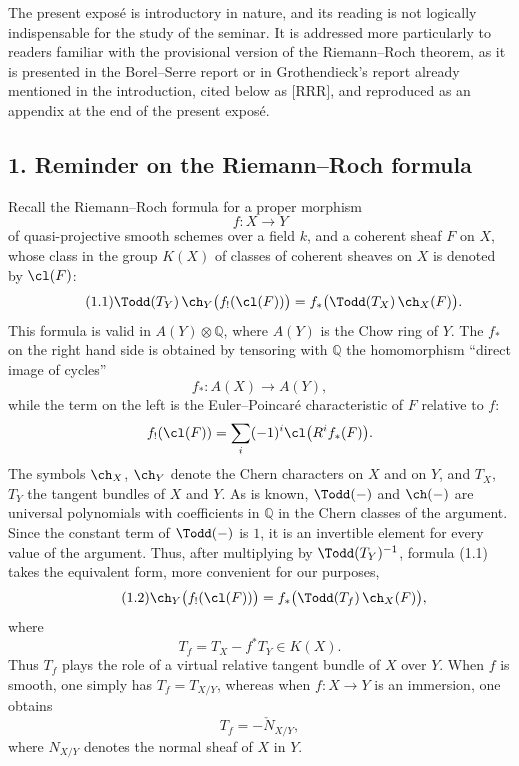 The present exposé is introductory in nature, and its reading is not logically indispensable for the study of the seminar. It is addressed more particularly to readers familiar with the provisional version of the Riemann--Roch theorem, as it is presented in the Borel--Serre report or in Grothendieck's report already mentioned in the introduction, cited below as [RRR], and reproduced as an appendix at the end of the present exposé.

\subsection*{1. Reminder on the Riemann--Roch formula}
Recall the Riemann--Roch formula for a proper morphism
\[
f:X\longrightarrow Y
\]
of quasi-projective smooth schemes over a field $k$, and a coherent sheaf $F$ on $X$, whose class in the group $K(X)$ of classes of coherent sheaves on $X$ is denoted by $\cl(F)$:
\begin{equation}\tag{1.1}
\Todd(T_Y)\,\ch_Y\bigl(f_!(\cl(F))\bigr)=f_*\bigl(\Todd(T_X)\,\ch_X(F)\bigr).
\end{equation}
This formula is valid in $A(Y)\otimes\mathbb Q$, where $A(Y)$ is the Chow ring of $Y$. The $f_*$ on the right hand side is obtained by tensoring with $\mathbb Q$ the homomorphism ``direct image of cycles''
\[
f_*:A(X)\longrightarrow A(Y),
\]
while the term on the left is the Euler--Poincaré characteristic of $F$ relative to $f$:
\[
f_!(\cl(F))=\sum_i(-1)^i\cl\bigl(R^if_*(F)\bigr).
\]
The symbols $\ch_X$, $\ch_Y$ denote the Chern characters on $X$ and on $Y$, and $T_X$, $T_Y$ the tangent bundles of $X$ and $Y$. As is known, $\Todd(-)$ and $\ch(-)$ are universal polynomials with coefficients in $\mathbb Q$ in the Chern classes of the argument. Since the constant term of $\Todd(-)$ is $1$, it is an invertible element for every value of the argument. Thus, after multiplying by $\Todd(T_Y)^{-1}$, formula (1.1) takes the equivalent form, more convenient for our purposes,
\begin{equation}\tag{1.2}
\ch_Y\bigl(f_!(\cl(F))\bigr)=f_*\bigl(\Todd(T_f)\,\ch_X(F)\bigr),
\end{equation}
where
\begin{equation}\tag{1.3}
T_f=T_X-f^*T_Y\in K(X).
\end{equation}
Thus $T_f$ plays the role of a virtual relative tangent bundle of $X$ over $Y$. When $f$ is smooth, one simply has $T_f=T_{X/Y}$, whereas when $f:X\to Y$ is an immersion, one obtains
\[
T_f=-\check N_{X/Y},
\]
where $N_{X/Y}$ denotes the normal sheaf of $X$ in $Y$.

